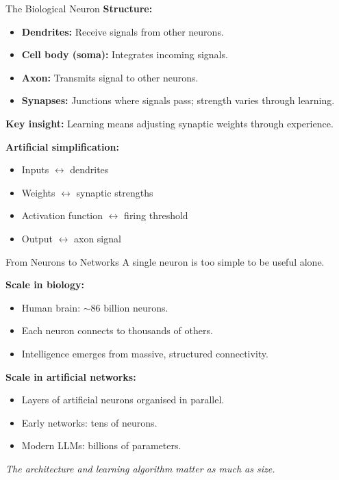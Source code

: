 \documentclass[10pt]{beamer}
\begin{document}
\begin{frame}{The Biological Neuron}
    \textbf{Structure:}
    \begin{itemize}
        \item \textbf{Dendrites:} Receive signals from other neurons.
        \item \textbf{Cell body (soma):} Integrates incoming signals.
        \item \textbf{Axon:} Transmits signal to other neurons.
        \item \textbf{Synapses:} Junctions where signals pass; strength varies through learning.
    \end{itemize}

    \vspace{0.2cm}
    \textbf{Key insight:} Learning means adjusting synaptic weights through experience.

    \vspace{0.2cm}
    \textbf{Artificial simplification:}
    \begin{itemize}
        \item Inputs $\leftrightarrow$ dendrites
        \item Weights $\leftrightarrow$ synaptic strengths
        \item Activation function $\leftrightarrow$ firing threshold
        \item Output $\leftrightarrow$ axon signal
    \end{itemize}
\end{frame}

\begin{frame}{From Neurons to Networks}
    A single neuron is too simple to be useful alone.

    \vspace{0.2cm}
    \textbf{Scale in biology:}
    \begin{itemize}
        \item Human brain: $\sim$86 billion neurons.
        \item Each neuron connects to thousands of others.
        \item Intelligence emerges from massive, structured connectivity.
    \end{itemize}

    \vspace{0.2cm}
    \textbf{Scale in artificial networks:}
    \begin{itemize}
        \item Layers of artificial neurons organised in parallel.
        \item Early networks: tens of neurons.
        \item Modern LLMs: billions of parameters.
    \end{itemize}

    \vspace{0.2cm}
    \textit{The architecture and learning algorithm matter as much as size.}
\end{frame}
\end{document}
